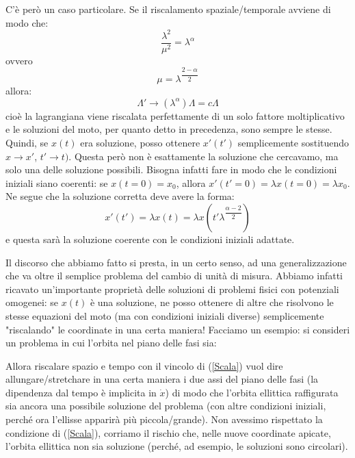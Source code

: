 \documentclass[a4paper,openany]{article}
\begin{document}
	C'è però un caso particolare. Se il riscalamento spaziale/temporale avviene di modo che:
	\begin{equation}
		\dfrac{\lambda^{2}}{\mu^{2}} = \lambda^{\alpha}
		\label{Scala}
	\end{equation}
	ovvero
	$$
	\mu = \lambda^{\dfrac{2-\alpha}{2}}
	$$
	allora:
	$$
	\Lambda' \rightarrow (\lambda^{\alpha})\Lambda = c\Lambda
	$$
	cioè la lagrangiana viene riscalata perfettamente di un solo fattore moltiplicativo e le soluzioni del moto, per quanto detto in precedenza, sono sempre le stesse. Quindi, se $x(t)$ era soluzione, posso ottenere $x'(t')$ semplicemente sostituendo $x\rightarrow x'$, $t'\rightarrow t)$. Questa però non è esattamente la soluzione che cercavamo, ma solo una delle soluzione possibili. Bisogna infatti fare in modo che le condizioni iniziali siano coerenti: se $x(t=0) = x_{0}$, allora $x'(t'=0) = \lambda x(t=0) = \lambda x_{0}$. Ne segue che la soluzione corretta deve avere la forma:
	$$
	x'(t') = \lambda x (t ) = \lambda x(t' \lambda^{\dfrac{\alpha-2}{2}})
	$$
	e questa sarà la soluzione coerente con le condizioni iniziali adattate. 
	
	Il discorso che abbiamo fatto si presta, in un certo senso, ad una generalizzazione che va oltre il semplice problema del cambio di unità di misura. Abbiamo infatti ricavato un'importante proprietà delle soluzioni di problemi fisici con potenziali omogenei: se $x(t)$ è una soluzione, ne posso ottenere di altre che risolvono le stesse equazioni del moto (ma con condizioni iniziali diverse) semplicemente "riscalando" le coordinate in una certa maniera! Facciamo un esempio: si consideri un problema in cui l'orbita nel piano delle fasi sia:
	\begin{figure}[H]
		\centering
	\end{figure}
	Allora riscalare spazio e tempo con il vincolo di (\ref{Scala}) vuol dire allungare/stretchare in una certa maniera i due assi del piano delle fasi (la dipendenza dal tempo è implicita in $\dot{x}$) di modo che l'orbita ellittica raffigurata sia ancora una possibile soluzione del problema (con altre condizioni iniziali, perché ora l'ellisse apparirà più piccola/grande). Non avessimo rispettato la condizione di (\ref{Scala}), corriamo il rischio che, nelle nuove coordinate apicate, l'orbita ellittica non sia soluzione (perché, ad esempio, le soluzioni sono circolari).
	
\end{document}

